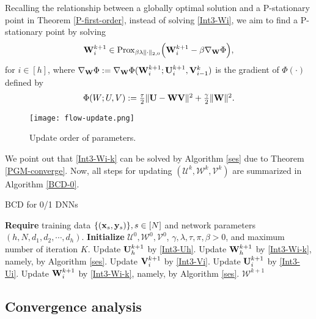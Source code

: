 \documentclass[journal]{IEEEtran}
\newcommand{\ba}{\begin{array}}
\newcommand{\ea}{\end{array}}
\def\U{{\bf U}}
\def\V{{\bf V}}
\def\W{{\bf W}}
\def\CU{{\boldsymbol{\mathcal U}}}
\def\CV{{\boldsymbol{\mathcal V}}}
\def\CW{{\boldsymbol{\mathcal W}}}
\def\x{{\bf x}}
\def\y{{\bf y}}
\begin{document}
Recalling the relationship between a globally optimal solution and a P-stationary point in Theorem \ref{P-first-order}, instead of solving  \eqref{Int3-Wi}, we aim to find a P-stationary point by solving
\begin{eqnarray}
 \label{Int3-Wi-k} 
\ba{lcll}
 \W_{i}^{k+1} \in   {\rm Prox}_{\beta \lambda\|\cdot\|_{2,0}}\Big( \W_i^{k+1}-\beta \nabla_\W \Phi\Big), \ea
\end{eqnarray}
for $i\in[h]$, where  $\nabla_\W \Phi:=\nabla_\W \Phi ( \W_{i}^{k+1}; \U_{i}^{k+1},\V_{i-1}^k)$ is the gradient of  $\Phi(\cdot)$ defined by
\begin{eqnarray}
 \label{Int3-Wi-obj}\ba{lcll}
 \Phi(W;U,V):=\frac{\tau}{2} \|\U-\W\V\|^2+\frac{\gamma }{2}\|\W\|^2.
 \ea
\end{eqnarray}
\begin{figure}[!th]
\centering
\texttt{[image: flow-update.png]}
  \caption{{Update order of parameters.}}\label{scheldual}
\end{figure}
We point out that \eqref{Int3-Wi-k} can be solved by Algorithm \ref{ses} due to Theorem \ref{PGM-converge}. Now,   all steps for updating $(\CU^{k}, \CW^{k}, \CV^k)$ are summarized in Algorithm \ref{BCD-0}.
 \begin{algorithm}[!th] \caption{BCD for 0/1 DNNs\label{BCD-0}}
	\begin{algorithmic}[1]
	\STATE \textbf{Require} training data $\{(\x_s,\y_s)\}, s\in[N]$ and network parameters $(h, N, d_1,d_2,\cdots,d_h)$.
	\STATE \textbf{Initialize} $\CU^{0}, \CW^{0}, \CV^0$, $\gamma, \lambda, \tau, \pi, \beta>0$, and maximum number of iteration $K$.
	\STATE Update $\U_h^{k+1}$ by \eqref{Int3-Uh}.
	\STATE Update $\W_h^{k+1}$ by \eqref{Int3-Wi-k}, namely, by Algorithm \ref{ses}.
		\STATE Update $\V_i^{k+1}$ by \eqref{Int3-Vi}.
		\STATE Update $\U_i^{k+1}$ by \eqref{Int3-Ui}.
		\STATE Update $\W_i^{k+1}$ by \eqref{Int3-Wi-k}, namely, by Algorithm \ref{ses}.
		\ENDFOR
\ENDFOR
\RETURN $\CW^{k+1}$
	\end{algorithmic}
\end{algorithm}


\subsection{Convergence analysis}
\end{document}
